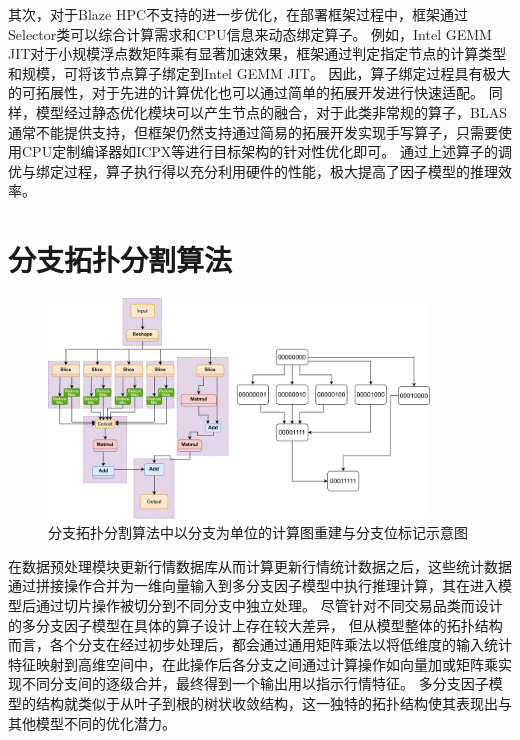 其次，对于Blaze HPC不支持的进一步优化，在部署框架过程中，框架通过Selector类可以综合计算需求和CPU信息来动态绑定算子。
例如，Intel GEMM JIT对于小规模浮点数矩阵乘有显著加速效果，框架通过判定指定节点的计算类型和规模，可将该节点算子绑定到Intel GEMM JIT。
因此，算子绑定过程具有极大的可拓展性，对于先进的计算优化也可以通过简单的拓展开发进行快速适配。
同样，模型经过静态优化模块可以产生节点的融合，对于此类非常规的算子，BLAS通常不能提供支持，但框架仍然支持通过简易的拓展开发实现手写算子，只需要使用CPU定制编译器如ICPX等进行目标架构的针对性优化即可。
通过上述算子的调优与绑定过程，算子执行得以充分利用硬件的性能，极大提高了因子模型的推理效率。

\section{分支拓扑分割算法}

\begin{figure}[h]
    \centering
    \includegraphics[width=0.9\textwidth]{image/chap03/modelg.png}
    \caption{分支拓扑分割算法中以分支为单位的计算图重建与分支位标记示意图}
    \label{fig:branchs}
\end{figure}
在数据预处理模块更新行情数据库从而计算更新行情统计数据之后，这些统计数据通过拼接操作合并为一维向量输入到多分支因子模型中执行推理计算，其在进入模型后通过切片操作被切分到不同分支中独立处理。
尽管针对不同交易品类而设计的多分支因子模型在具体的算子设计上存在较大差异，
但从模型整体的拓扑结构而言，各个分支在经过初步处理后，都会通过通用矩阵乘法以将低维度的输入统计特征映射到高维空间中，在此操作后各分支之间通过计算操作如向量加或矩阵乘实现不同分支间的逐级合并，最终得到一个输出用以指示行情特征。
多分支因子模型的结构就类似于从叶子到根的树状收敛结构，这一独特的拓扑结构使其表现出与其他模型不同的优化潜力。

